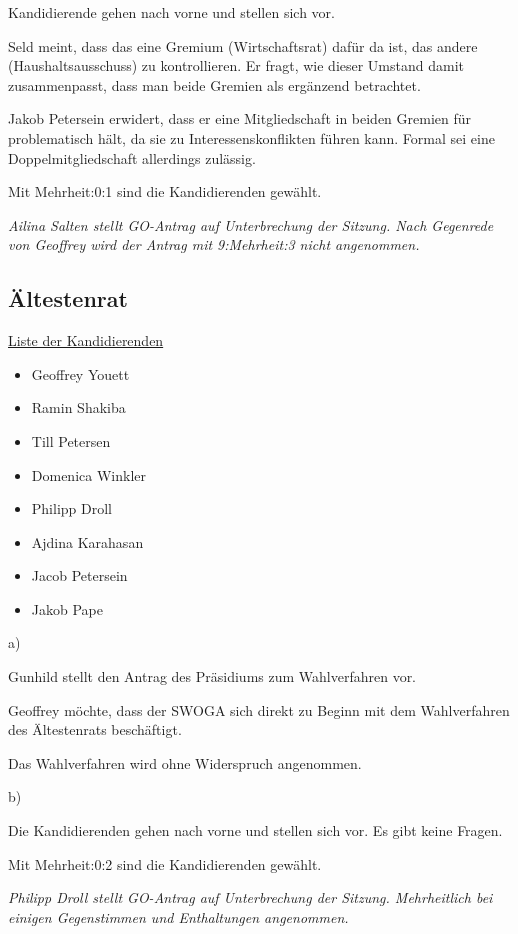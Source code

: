 \documentclass[ngerman,headheight=70pt]{scrartcl}
\begin{document}
    Kandidierende gehen nach vorne und stellen sich vor.

    Seld meint, dass das eine Gremium (Wirtschaftsrat) dafür da ist, das andere
    (Haushaltsausschuss) zu kontrollieren. Er fragt, wie dieser Umstand damit
    zusammenpasst, dass man beide Gremien als ergänzend betrachtet.

    Jakob Petersein erwidert, dass er eine Mitgliedschaft in beiden Gremien
    für problematisch hält, da sie zu Interessenskonflikten führen kann.
    Formal sei eine Doppelmitgliedschaft allerdings zulässig.

    Mit Mehrheit:0:1 sind die Kandidierenden gewählt.

    \textit{Ailina Salten stellt GO-Antrag auf Unterbrechung der Sitzung.
    Nach Gegenrede von Geoffrey wird der Antrag mit 9:Mehrheit:3 nicht
    angenommen.}

    \subsection{Ältestenrat}

    \underline{Liste der Kandidierenden}
    \begin{itemize}
        \item Geoffrey Youett
        \item Ramin Shakiba
        \item Till Petersen
        \item Domenica Winkler
        \item Philipp Droll
        \item Ajdina Karahasan
        \item Jacob Petersein
        \item Jakob Pape
    \end{itemize}

    a)

    Gunhild stellt den Antrag des Präsidiums zum Wahlverfahren vor.

    Geoffrey möchte, dass der SWOGA sich direkt zu Beginn mit dem Wahlverfahren
    des Ältestenrats beschäftigt.

    Das Wahlverfahren wird ohne Widerspruch angenommen.

    b)

    Die Kandidierenden gehen nach vorne und stellen sich vor. Es gibt
    keine Fragen.

    Mit Mehrheit:0:2 sind die Kandidierenden gewählt.

    \textit{Philipp Droll stellt GO-Antrag auf Unterbrechung der Sitzung.
    Mehrheitlich bei einigen Gegenstimmen und Enthaltungen angenommen.}


\end{document}
